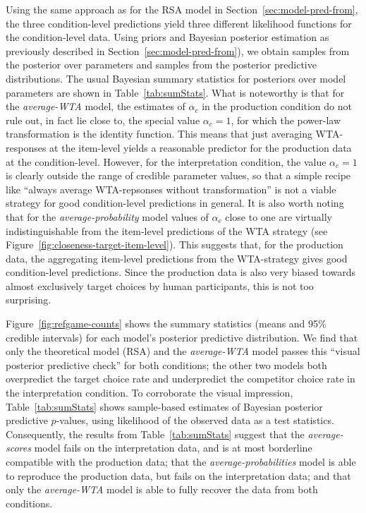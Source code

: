 \documentclass[fleqn]{article}
\begin{document}
Using the same approach as for the RSA model in Section~\ref{sec:model-pred-from}, the three condition-level predictions yield three different likelihood functions for the condition-level data.
Using priors and Bayesian posterior estimation as previously described in Section~\ref{sec:model-pred-from}), we obtain samples from the posterior over parameters and samples from the posterior predictive distributions.
The usual Bayesian summary statistics for posteriors over model parameters are shown in Table~\ref{tab:sumStats}.
What is noteworthy is that for the \emph{average-WTA} model, the estimates of $\alpha_{c}$ in the production condition do not rule out, in fact lie close to, the special value $\alpha_{c}=1$, for which the power-law transformation is the identity function.
This means that just averaging WTA-responses at the item-level yields a reasonable predictor for the production data at the condition-level.
However, for the interpretation condition, the value $\alpha_{c}=1$ is clearly outside the range of credible parameter values, so that a simple recipe like ``always average WTA-repsonses without transformation'' is not a viable strategy for good condition-level predictions in general.
It is also worth noting that for the \emph{average-probability} model values of $\alpha_{c}$ close to one are virtually indistinguishable from the item-level predictions of the WTA strategy (see Figure~\ref{fig:closeness-target-item-level}).
This suggests that, for the production data, the aggregating item-level predictions from the WTA-strategy gives good condition-level predictions.
Since the production data is also very biased towards almost exclusively target choices by human participants, this is not too surprising.

Figure~\ref{fig:refgame-counts} shows the summary statistics (means and 95\% credible intervals) for each model's posterior predictive distribution.
We find that only the theoretical model (RSA) and the \emph{average-WTA} model passes this ``visual posterior predictive check'' for both conditions; the other two models both overpredict the target choice rate and underpredict the competitor choice rate in the interpretation condition.
To corroborate the visual impression, Table~\ref{tab:sumStats} shows sample-based estimates of Bayesian posterior predictive $p$-values, using likelihood of the observed data as a test statistics.
Consequently, the results from Table~\ref{tab:sumStats} suggest that the \emph{average-scores} model fails on the interpretation data, and is at most borderline compatible with the production data; that the \emph{average-probabilities} model is able to reproduce the production data, but fails on the interpretation data; and that only the \emph{average-WTA} model is able to fully recover the data from both conditions.
\end{document}
